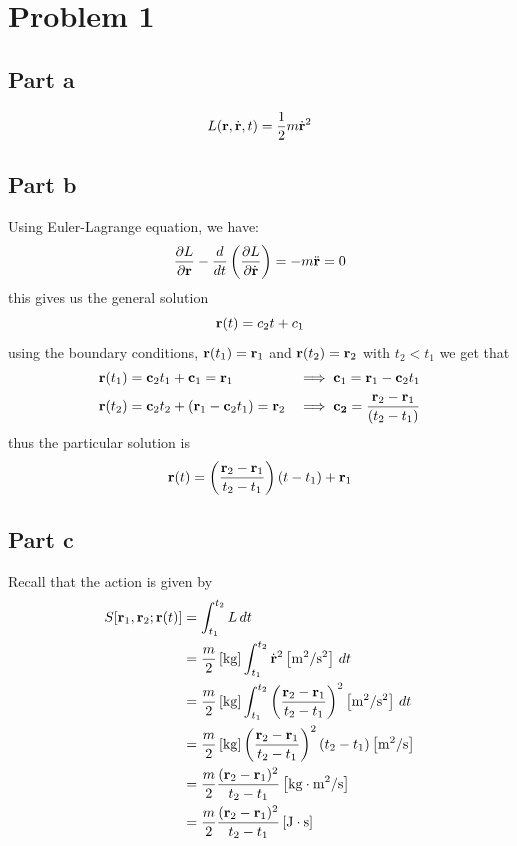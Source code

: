 \documentclass[12pt]{report}
\newcommand{\rb}{\bold{r}}
\begin{document}
\maketitle

\section*{Problem 1}
\subsection*{Part a}
\begin{equation*}
    L(\rb,\dot{\rb},t) = \frac{1}{2}m\dot{\rb}^2
\end{equation*}
\subsection*{Part b}
Using Euler-Lagrange equation, we have:
\begin{equation*}
    \frac{\partial L}{\partial \rb} - \frac{d}{dt}\left(\frac{\partial L}{\partial \dot{\rb}}\right) =  -m\ddot{\rb} = 0
\end{equation*}
this gives us the general solution
\begin{equation*}
    \rb(t) = c_2 t + c_1
\end{equation*}
using the boundary conditions, $\rb(t_1) = \rb_1$ and $\rb(t_2) = \rb_2$ with $t_2 < t_1$ we get that
\begin{align*}
    \rb(t_1) &= \bold{c}_2t_1 + \bold{c}_1 = \rb_1 &\implies \bold{c}_1 = \rb_1 - \bold{c}_2t_1 \\
    \rb(t_2) &= \bold{c}_2 t_2 + (\rb_1 - \bold{c}_2t_1) = \rb_2 &\implies \bold{c_2} = \frac{\rb_2 - \rb_1}{(t_2 - t_1)}
\end{align*}
thus the particular solution is
\begin{equation*}
    \rb(t) = \left(\frac{\rb_2 - \rb_1}{t_2-t_1}\right)(t-t_1) + \rb_1
\end{equation*}
\subsection*{Part c}
Recall that the action is given by
\begin{align*}
    S[\rb_1,\rb_2; \rb(t)] &= \int_{t_1}^{t_2} L \, dt \\
                           &= \frac{m}{2}\left[\si{kg}\right]\int_{t_1}^{t_2} \dot{\rb}^2 \left[\si{m^2\per s^2}\right] \, dt \\
                           &= \frac{m}{2}\left[\si{kg}\right] \int_{t_1}^{t_2} \left(\frac{\rb_2 - \rb_1}{t_2 - t_1}\right)^2 \left[\si{m^2\per s^2}\right] \, dt \\
                           &= \frac{m}{2}\left[\si{kg}\right]  \left(\frac{\rb_2 - \rb_1}{t_2 - t_1}\right)^2 (t_2 - t_1) \left[\si{m^2\per s}\right]\\
                           &= \frac{m}{2}\frac{(\rb_2 - \rb_1)^2}{t_2 - t_1}\left[\si{kg \cdot m^2\per s}\right]\\
                           &= \frac{m}{2}\frac{(\rb_2 - \rb_1)^2}{t_2 - t_1}\left[\si{J \cdot s}\right]
\end{align*}
\end{document}
